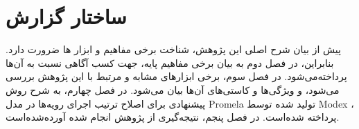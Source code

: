 \section{ساختار گزارش}
پیش از بیان شرح اصلی این پژوهش، شناخت برخی مفاهیم و ابزار ها ضرورت دارد. بنابراین، در فصل دوم به بیان برخی مفاهیم پایه، جهت کسب آگاهی نسبت به آن‌ها پرداخته‌می‌شود. در فصل سوم، برخی ابزارهای مشابه و مرتبط با این پژوهش بررسی می‌شود، و ویژگی‌ها و کاستی‌های آن‌ها بیان می‌شود. در فصل چهارم، به شرح روش پیشنهادی برای اصلاح ترتیب اجرای رویه‌ها در مدل Promela تولید شده توسط Modex ، پرداخته شده‌است. در فصل پنجم، نتیجه‌گیری از پژوهش انجام شده آورده‌شده‌است.

